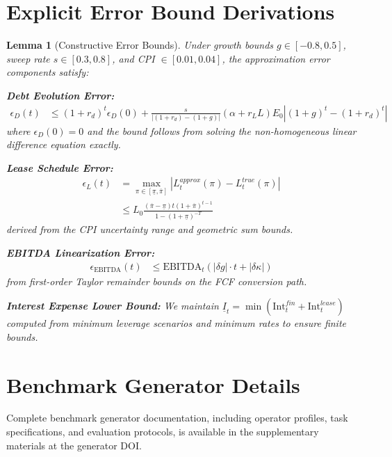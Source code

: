 \documentclass[11pt,a4paper]{article}
\newtheorem{lemma}{Lemma}
\begin{document}


\section{Explicit Error Bound Derivations}
\label{app:error_bounds}

\begin{lemma}[Constructive Error Bounds]
\label{lem:error_bounds}
Under growth bounds $g \in [-0.8, 0.5]$, sweep rate $s \in [0.3, 0.8]$, and CPI $\in [0.01, 0.04]$, the approximation error components satisfy:

\textbf{Debt Evolution Error:}
\begin{align}
\epsilon_D(t) &\leq (1+r_d)^t \epsilon_D(0) + \frac{s}{|(1+r_d) - (1+g)|} (\alpha + r_L L) E_0 |(1+g)^t - (1+r_d)^t|
\end{align}
where $\epsilon_D(0) = 0$ and the bound follows from solving the non-homogeneous linear difference equation exactly.

\textbf{Lease Schedule Error:}
\begin{align}
\epsilon_L(t) &= \max_{\pi \in [\underline{\pi}, \overline{\pi}]} |L^{approx}_t(\pi) - L^{true}_t(\pi)| \\
&\leq L_0 \frac{(\overline{\pi} - \underline{\pi}) t (1 + \overline{\pi})^{t-1}}{1 - (1 + \underline{\pi})^{-T}}
\end{align}
derived from the CPI uncertainty range and geometric sum bounds.

\textbf{EBITDA Linearization Error:}
\begin{align}
\epsilon_{\text{EBITDA}}(t) &\leq \text{EBITDA}_t (|\delta g| \cdot t + |\delta \kappa|)
\end{align}
from first-order Taylor remainder bounds on the FCF conversion path.

\textbf{Interest Expense Lower Bound:}
We maintain $\underline{I}_t = \min(\text{Int}^{fin}_t + \text{Int}^{lease}_t)$ computed from minimum leverage scenarios and minimum rates to ensure finite bounds.
\end{lemma}

\section{Benchmark Generator Details}
\label{app:benchmark}

Complete benchmark generator documentation, including operator profiles, task specifications, and evaluation protocols, is available in the supplementary materials at the generator DOI.
\end{document}
